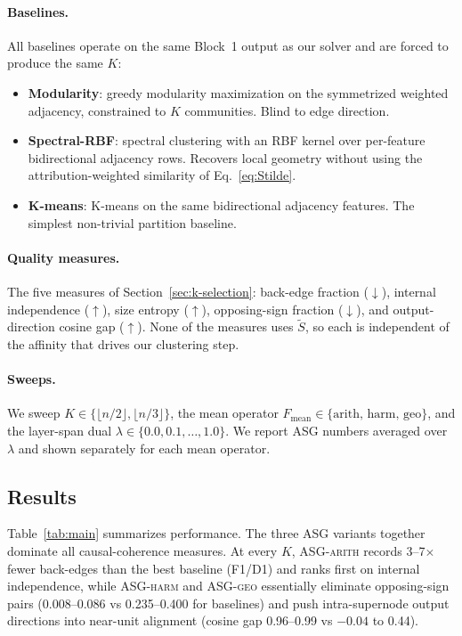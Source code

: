 \documentclass[table, 11pt]{article}
\begin{document}
\paragraph{Baselines.}
All baselines operate on the same Block~1 output as our solver and
are forced to produce the same $K$:
\begin{itemize}[leftmargin=*,topsep=2pt,itemsep=1pt]
\item \textbf{Modularity}: greedy modularity maximization on the
symmetrized weighted adjacency, constrained to $K$ communities. Blind
to edge direction.
\item \textbf{Spectral-RBF}: spectral clustering with an RBF kernel
over per-feature bidirectional adjacency rows. Recovers local
geometry without using the attribution-weighted similarity of
Eq.~\eqref{eq:Stilde}.
\item \textbf{K-means}: K-means on the same bidirectional adjacency
features. The simplest non-trivial partition baseline.
\end{itemize}

\paragraph{Quality measures.}
The five measures of Section~\ref{sec:k-selection}: back-edge fraction
($\downarrow$), internal independence ($\uparrow$), size entropy
($\uparrow$), opposing-sign fraction ($\downarrow$), and
output-direction cosine gap ($\uparrow$). None of the measures uses
$\tilde S$, so each is independent of the affinity that drives our
clustering step.

\paragraph{Sweeps.}
We sweep $K \in \{\lfloor n/2 \rfloor, \lfloor n/3 \rfloor\}$, the
mean operator $F_{\text{mean}} \in \{\text{arith, harm, geo}\}$, and
the layer-span dual $\lambda \in \{0.0, 0.1, \ldots, 1.0\}$. We
report ASG numbers averaged over $\lambda$ and shown separately for
each mean operator.

\subsection{Results}

Table~\ref{tab:main} summarizes performance. The three ASG variants
together dominate all causal-coherence measures. At every $K$,
\textsc{ASG-arith} records 3--7$\times$ fewer back-edges than the
best baseline (F1/D1) and ranks first on internal independence,
while \textsc{ASG-harm} and \textsc{ASG-geo} essentially eliminate
opposing-sign pairs (0.008--0.086 vs 0.235--0.400 for baselines) and
push intra-supernode output directions into near-unit alignment
(cosine gap 0.96--0.99 vs $-0.04$ to 0.44).
\end{document}
